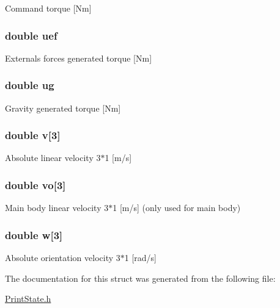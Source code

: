 Command torque \mbox{[}Nm\mbox{]} \hypertarget{struct_save_l_i_n_k_a48e660e5c4e92e6b18ac669bf27e5972}{
\subsubsection[{uef}]{\setlength{\rightskip}{0pt plus 5cm}double uef}}\label{struct_save_l_i_n_k_a48e660e5c4e92e6b18ac669bf27e5972}
Externals forces generated torque \mbox{[}Nm\mbox{]} \hypertarget{struct_save_l_i_n_k_a26599157c0b45c8f13eb679ca9a2a491}{
\subsubsection[{ug}]{\setlength{\rightskip}{0pt plus 5cm}double ug}}\label{struct_save_l_i_n_k_a26599157c0b45c8f13eb679ca9a2a491}
Gravity generated torque \mbox{[}Nm\mbox{]} \hypertarget{struct_save_l_i_n_k_ad8b2664bf7d7db7f9685845624616041}{
\subsubsection[{v}]{\setlength{\rightskip}{0pt plus 5cm}double v\mbox{[}3\mbox{]}}}\label{struct_save_l_i_n_k_ad8b2664bf7d7db7f9685845624616041}
Absolute linear velocity 3$\ast$1 \mbox{[}m/s\mbox{]} \hypertarget{struct_save_l_i_n_k_a5176e240065420f1a352ace313fc7f31}{
\subsubsection[{vo}]{\setlength{\rightskip}{0pt plus 5cm}double vo\mbox{[}3\mbox{]}}}\label{struct_save_l_i_n_k_a5176e240065420f1a352ace313fc7f31}
Main body linear velocity 3$\ast$1 \mbox{[}m/s\mbox{]} (only used for main body) \hypertarget{struct_save_l_i_n_k_a7c97a8f43de02c47555b4fcc74991b61}{
\subsubsection[{w}]{\setlength{\rightskip}{0pt plus 5cm}double w\mbox{[}3\mbox{]}}}\label{struct_save_l_i_n_k_a7c97a8f43de02c47555b4fcc74991b61}
Absolute orientation velocity 3$\ast$1 \mbox{[}rad/s\mbox{]} 

The documentation for this struct was generated from the following file\-:\begin{DoxyCompactItemize}
\item 
\hyperlink{_print_state_8h}{Print\-State.\-h}\end{DoxyCompactItemize}
